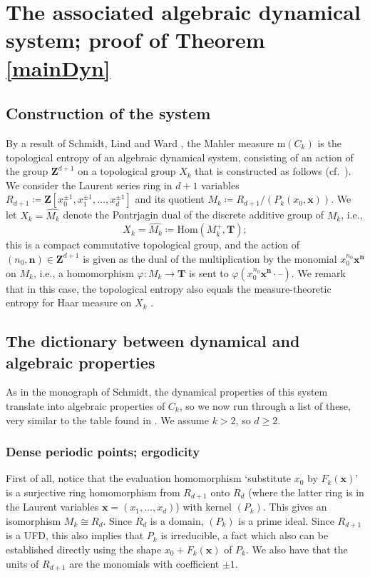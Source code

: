 \documentclass[12pt,reqno]{amsart}
\theoremstyle{definition}
\theoremstyle{plain}
\theoremstyle{definition}
\newcommand{\Z}{\mathbf{Z}}
\newcommand{\T}{\mathbf{T}}
\newcommand\m{\mathrm{m}}
\renewcommand{\geq}{\geqslant}
\begin{document}
\section{The associated algebraic dynamical system; proof of Theorem \ref{mainDyn}} \label{DS} 

\subsection{Construction of the system} \label{constDS} 
By a result of Schmidt, Lind and Ward \cite[Thm.~3.1]{SchmidtLindWard}, the Mahler measure $\m(C_k)$ is the topological entropy of an algebraic dynamical system, consisting of an action of the group $\Z^{d+1}$ on a topological group $X_k$ that is constructed as follows (cf.\ \cite[\S 11]{KitchensSchmidt}). We consider the Laurent series ring in $d+1$ variables $R_{d+1}\coloneqq \Z[x_0^{\pm 1}, x_1^{\pm 1},\dots,x_d^{\pm 1}]$ and its quotient $M_k\coloneqq R_{d+1}/(P_k(x_0,\mathbf{x}))$. We let $X_k=\widehat{M_k}$ denote the Pontrjagin dual of the discrete additive group of $M_k$, i.e.,  $$X_k=\widehat{M_k}\coloneqq \mathrm{Hom}(M_k^+,\T);$$ this is a compact commutative topological group, and the action of $(n_0,\mathbf{n}) \in \Z^{d+1}$ is given as the dual of the multiplication by the monomial $x_0^{n_0} \mathbf{x}^{\mathbf{n}}$ on $M_k$, i.e., a homomorphism $\varphi \colon M_k \rightarrow \T$ is sent to $\varphi( x_0^{n_0} \mathbf{x}^{\mathbf{n}} \cdot \text{--})$. We remark that in this case, the topological entropy also equals the measure-theoretic entropy for Haar measure on $X_k$ \cite[13.3]{Schmidt}. 

\subsection{The dictionary between dynamical and algebraic properties} 
As in the monograph \cite{Schmidt} of Schmidt, the dynamical properties of this system translate into algebraic properties of $C_k$, so we now run through a list of these, very similar to the table found in \cite[Fig.~1, p.\ xiii]{Schmidt}. We assume $k > 2$, so $d \geq 2$. 

\subsubsection*{Dense periodic points; ergodicity} First of all, notice that the evaluation homomorphism `substitute $x_0$ by $F_k(\mathbf{x})$' is a surjective ring homomorphism from $R_{d+1}$ onto $R_d$ (where the latter ring is in the Laurent variables $\mathbf x = (x_1,\dots,x_d)$) with kernel $(P_k)$. This gives an isomorphism $M_k \cong R_d$. Since $R_d$ is a domain, $(P_k)$ is a prime ideal. Since $R_{d+1}$ is a UFD, this also implies that $P_k$ is irreducible, a fact which also can be established directly using the shape $x_0+F_k(\mathbf{x})$ of $P_k$. We also have that the units of $R_{d+1}$ are the monomials with coefficient $\pm 1$.  
\end{document}
